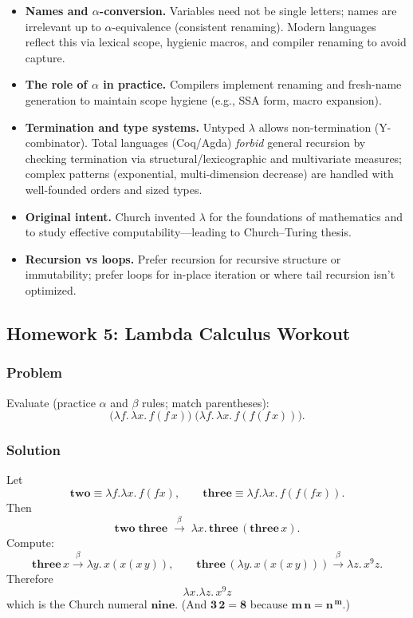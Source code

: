 \documentclass{article}
\theoremstyle{theorem}
\theoremstyle{definition}
\theoremstyle{remark}
\begin{document}
\begin{itemize}
  \item \textbf{Names and $\alpha$-conversion.} Variables need not be single letters; names are irrelevant up to $\alpha$-equivalence (consistent renaming). Modern languages reflect this via lexical scope, hygienic macros, and compiler renaming to avoid capture.
  \item \textbf{The role of $\alpha$ in practice.} Compilers implement renaming and fresh-name generation to maintain scope hygiene (e.g., SSA form, macro expansion).
  \item \textbf{Termination and type systems.} Untyped $\lambda$ allows non-termination (Y-combinator). Total languages (Coq/Agda) \emph{forbid} general recursion by checking termination via structural/lexicographic and multivariate measures; complex patterns (exponential, multi-dimension decrease) are handled with well-founded orders and sized types.
  \item \textbf{Original intent.} Church invented $\lambda$ for the foundations of mathematics and to study effective computability—leading to Church–Turing thesis.
  \item \textbf{Recursion vs loops.} Prefer recursion for recursive structure or immutability; prefer loops for in-place iteration or where tail recursion isn’t optimized.
\end{itemize}

\subsection{Homework 5: Lambda Calculus Workout}

\subsubsection*{Problem}
Evaluate (practice $\alpha$ and $\beta$ rules; match parentheses):
\[
\Big(\lambda f.\,\lambda x.\,f(f\,x)\Big)\;
\Big(\lambda f.\,\lambda x.\,f(f(f\,x))\Big).
\]

\subsubsection*{Solution}
Let
\[
\mathbf{two} \equiv \lambda f.\lambda x.\,f(fx),\qquad
\mathbf{three} \equiv \lambda f.\lambda x.\,f(f(fx)).
\]
Then
\[
\mathbf{two}\;\mathbf{three}
\;\xrightarrow{\beta}\;
\lambda x.\,\mathbf{three}\,(\mathbf{three}\,x).
\]
Compute:
\[
\mathbf{three}\,x \xrightarrow{\beta} \lambda y.\,x(x(x\,y)),
\qquad
\mathbf{three}\,(\lambda y.\,x(x(x\,y))) \xrightarrow{\beta} \lambda z.\,x^{9}z.
\]
Therefore
\[
\boxed{\lambda x.\lambda z.\,x^{9}z}
\]
which is the Church numeral $\mathbf{nine}$.
(And $\mathbf{3}\,\mathbf{2}=\mathbf{8}$ because $\mathbf{m}\,\mathbf{n}=\mathbf{n}^{\,\mathbf{m}}$.)
\end{document}

